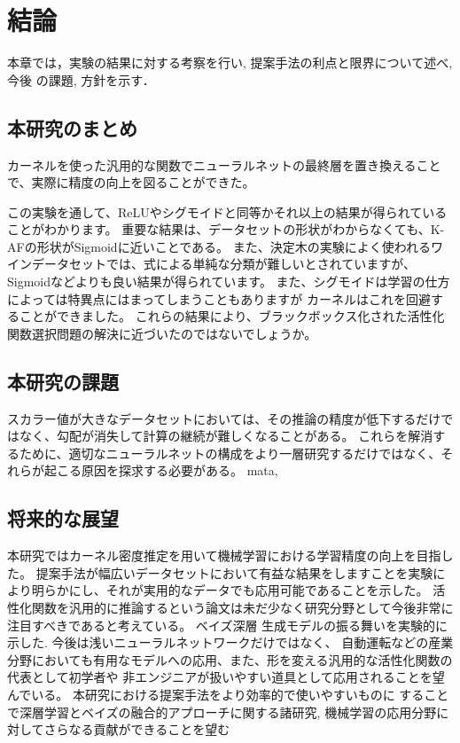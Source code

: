 \chapter{結論}
\label{conclusion}

本章では，実験の結果に対する考察を行い, 提案手法の利点と限界について述べ, 今後
の課題, 方針を示す．


\section{本研究のまとめ}

カーネルを使った汎用的な関数でニューラルネットの最終層を置き換えることで、実際に精度の向上を図ることができた。

 この実験を通して、ReLUやシグモイドと同等かそれ以上の結果が得られていることがわかります。
 重要な結果は、データセットの形状がわからなくても、K-AFの形状がSigmoidに近いことである。 
 また、決定木の実験によく使われるワインデータセットでは、式による単純な分類が難しいとされていますが、Sigmoidなどよりも良い結果が得られています。
 また、シグモイドは学習の仕方によっては特異点にはまってしまうこともありますが カーネルはこれを回避することができました。
 これらの結果により、ブラックボックス化された活性化関数選択問題の解決に近づいたのではないでしょうか。

\section{本研究の課題}
スカラー値が大きなデータセットにおいては、その推論の精度が低下するだけではなく、勾配が消失して計算の継続が難しくなることがある。
これらを解消するために、適切なニューラルネットの構成をより一層研究するだけではなく、それらが起こる原因を探求する必要がある。
mata,



\section{将来的な展望}


本研究ではカーネル密度推定を用いて機械学習における学習精度の向上を目指した。
提案手法が幅広いデータセットにおいて有益な結果をしますことを実験により明らかにし、それが実用的なデータでも応用可能であることを示した。
活性化関数を汎用的に推論するという論文は未だ少なく研究分野として今後非常に注目すべきであると考えている。 ベイズ深層
生成モデルの振る舞いを実験的に示した. 今後は浅いニューラルネットワークだけではなく、
自動運転などの産業分野においても有用なモデルへの応用、また、形を変える汎用的な活性化関数の代表として初学者や
非エンジニアが扱いやすい道具として応用されることを望んでいる。
本研究における提案手法をより効率的で使いやすいものに
することで深層学習とベイズの融合的アプローチに関する諸研究, 機械学習の応用分野に
対してさらなる貢献ができることを望む

